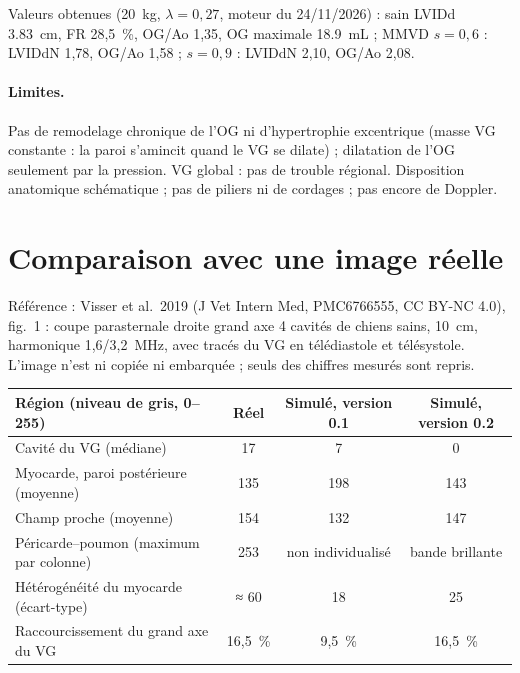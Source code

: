 \documentclass[10pt,a4paper]{article}
\begin{document}
Valeurs obtenues (\SI{20}{kg}, $\lambda=0{,}27$, moteur du 24/11/2026) : sain LVIDd \SI{3,83}{cm}, FR 28,5~\%, OG/Ao 1,35,
OG maximale \SI{18,9}{mL} ; MMVD $s=0{,}6$ : LVIDdN 1,78, OG/Ao 1,58 ; $s=0{,}9$ : LVIDdN 2,10, OG/Ao 2,08.

\paragraph{Limites.} Pas de remodelage chronique de l'OG ni d'hypertrophie excentrique (masse VG constante : la paroi
s'amincit quand le VG se dilate) ; dilatation de l'OG seulement par la pression. VG global : pas de trouble régional.
Disposition anatomique schématique ; pas de piliers ni de cordages ; pas encore de Doppler.

\section{Comparaison avec une image réelle}
Référence : Visser et al.\ 2019 (J Vet Intern Med, PMC6766555, CC BY-NC 4.0), fig.~1 : coupe parasternale droite grand
axe 4 cavités de chiens sains, \SI{10}{cm}, harmonique 1,6/3,2~MHz, avec tracés du VG en télédiastole et télésystole.
L'image n'est ni copiée ni embarquée ; seuls des chiffres mesurés sont repris.

\begin{tabularx}{\linewidth}{@{}Xccc@{}}
\toprule
Région (niveau de gris, 0--255) & Réel & Simulé, version 0.1 & Simulé, version 0.2\\\midrule
Cavité du VG (médiane) & 17 & 7 & 0\\
Myocarde, paroi postérieure (moyenne) & 135 & 198 & 143\\
Champ proche (moyenne) & 154 & 132 & 147\\
Péricarde--poumon (maximum par colonne) & 253 & non individualisé & bande brillante\\
Hétérogénéité du myocarde (écart-type) & ≈ 60 & 18 & 25\\
Raccourcissement du grand axe du VG & 16,5~\% & 9,5~\% & 16,5~\%\\
\bottomrule
\end{tabularx}
\end{document}
